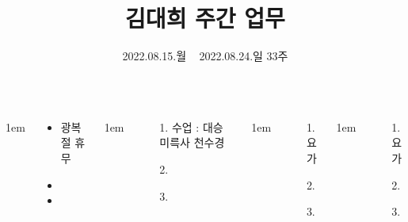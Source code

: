 \documentclass[25pt, a1paper ]{tikzposter}
\title{ 김대희 주간 업무 }
\author{ 2022.08.15.월 ~ 2022.08.24.일 33주 }
\begin{document}
	\begin{columns}


			{
					\setlength{\leftmargini}{4em}
					\setlength{\labelsep} {1em}
				\begin{LARGE}
					\begin{itemize}
					\item 광복절 휴무
					\item 
					\item 
					\end{itemize}
				\end{LARGE}
			}


			{
					\setlength{\leftmargini}{4em}
					\setlength{\labelsep} {1em}
				\begin{LARGE}
					\begin{itemize}
					\item [1.] 수업 : 대승 미륵사 천수경
					\item [2.] 
					\item [3.] 
					\end{itemize}
				\end{LARGE}
			}



			{
					\setlength{\leftmargini}{4em}
					\setlength{\labelsep} {1em}
				\begin{LARGE}
					\begin{itemize}
					\item [1.] 요가
					\item [2.] 
					\item [3.] 
					\end{itemize}
				\end{LARGE}
			}


			{
					\setlength{\leftmargini}{4em}
					\setlength{\labelsep} {1em}
				\begin{LARGE}
					\begin{itemize}
					\item [1.] 요가
					\item [2.] 
					\item [3.] 
					\end{itemize}
				\end{LARGE}
			}


\end{columns}
\end{document}
